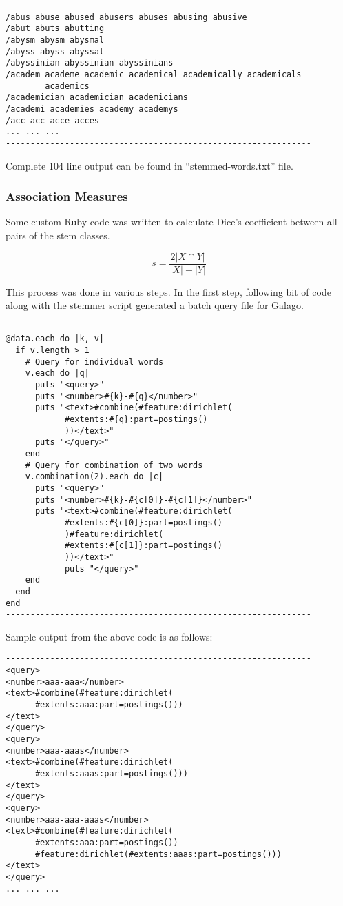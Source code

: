 \documentclass[letterpaper,12pt]{article}
\begin{document}
\begin{verbatim}
--------------------------------------------------------------
/abus abuse abused abusers abuses abusing abusive
/abut abuts abutting
/abysm abysm abysmal
/abyss abyss abyssal
/abyssinian abyssinian abyssinians
/academ academe academic academical academically academicals
        academics
/academician academician academicians
/academi academies academy academys
/acc acc acce acces
... ... ...
--------------------------------------------------------------
\end{verbatim}

Complete 104 line output can be found in ``stemmed-words.txt'' file.

\subsubsection{Association Measures}

Some custom Ruby code was written to calculate Dice's coefficient between all pairs of the stem classes.

$$ s = \frac{2|X \cap Y|}{|X| + |Y|} $$

This process was done in various steps. In the first step, following bit of code along with the stemmer script generated a batch query file for Galago.

\begin{verbatim}
--------------------------------------------------------------
@data.each do |k, v|
  if v.length > 1
    # Query for individual words
    v.each do |q|
      puts "<query>"
      puts "<number>#{k}-#{q}</number>"
      puts "<text>#combine(#feature:dirichlet(
            #extents:#{q}:part=postings()
            ))</text>"
      puts "</query>"
    end
    # Query for combination of two words
    v.combination(2).each do |c|
      puts "<query>"
      puts "<number>#{k}-#{c[0]}-#{c[1]}</number>"
      puts "<text>#combine(#feature:dirichlet(
            #extents:#{c[0]}:part=postings()
            )#feature:dirichlet(
            #extents:#{c[1]}:part=postings()
            ))</text>"
            puts "</query>"
    end
  end
end
--------------------------------------------------------------
\end{verbatim}

Sample output from the above code is as follows:

\begin{verbatim}
--------------------------------------------------------------
<query>
<number>aaa-aaa</number>
<text>#combine(#feature:dirichlet(
      #extents:aaa:part=postings()))
</text>
</query>
<query>
<number>aaa-aaas</number>
<text>#combine(#feature:dirichlet(
      #extents:aaas:part=postings()))
</text>
</query>
<query>
<number>aaa-aaa-aaas</number>
<text>#combine(#feature:dirichlet(
      #extents:aaa:part=postings())
      #feature:dirichlet(#extents:aaas:part=postings()))
</text>
</query>
... ... ...
--------------------------------------------------------------
\end{verbatim}
\end{document}
